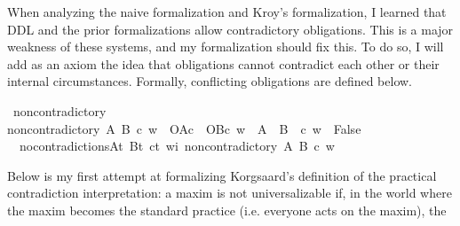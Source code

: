 \begin{isabellebody}
\begin{isamarkuptext}
When analyzing the naive formalization and Kroy's formalization, I learned that DDL and the prior 
formalizations allow contradictory obligations. This is a major weakness of these systems, and my 
formalization should fix this. To do so, I will add as an axiom the idea that obligations cannot 
contradict each other or their internal circumstances. Formally, conflicting obligations are defined below.%
\end{isamarkuptext}\isamarkuptrue%
\isamarkupfalse%
\ non{\isacharunderscore}contradictory\ \ \isanewline
{\isachardoublequoteopen}non{\isacharunderscore}contradictory\ A\ B\ c\ w\ {\isasymequiv}\ {\isacharparenleft}{\isacharparenleft}O{\isacharbraceleft}A{\isacharbar}c{\isacharbraceright}\ \isactrlbold {\isasymand}\ O{\isacharbraceleft}B{\isacharbar}c{\isacharbraceright}{\isacharparenright}\ w{\isacharparenright}\ {\isasymlongrightarrow}\ {\isasymnot}{\isacharparenleft}{\isacharparenleft}A\ \isactrlbold {\isasymand}\ {\isacharparenleft}B\ \isactrlbold {\isasymand}\ c{\isacharparenright}{\isacharparenright}\ w\ {\isasymlongrightarrow}\ False{\isacharparenright}{\isachardoublequoteclose}\isanewline
%
\isanewline
\isanewline
{}\isamarkupfalse%
\ \ no{\isacharunderscore}contradictions{\isacharcolon}{\isachardoublequoteopen}{\isasymforall}A{\isacharcolon}{\isacharcolon}t{\isachardot}\ {\isasymforall}B{\isacharcolon}{\isacharcolon}t{\isachardot}\ {\isasymforall}c{\isacharcolon}{\isacharcolon}t{\isachardot}\ {\isasymforall}w{\isacharcolon}{\isacharcolon}i{\isachardot}\ non{\isacharunderscore}contradictory\ A\ B\ c\ w{\isachardoublequoteclose}\isanewline
%
%
\isadelimdocument
%
\endisadelimdocument
%
\isatagdocument
%
\isamarkuptrue%
%
\endisatagdocument
{\isafolddocument}%
%
\isadelimdocument
%
\endisadelimdocument
%
\begin{isamarkuptext}%
Below is my first attempt at formalizing Korgsaard's definition of the practical contradiction
interpretation:  a maxim is not universalizable 
if, in the world where the maxim becomes the standard practice (i.e. everyone acts on the maxim), the

\end{isamarkuptext}
\end{isabellebody}
